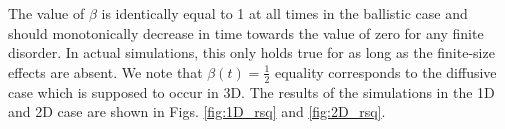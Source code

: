 \documentclass[10pt,a4paper]{article}
\begin{document}
\noindent 
The value of $\beta$ is identically equal to 1 at all times in the ballistic case and should monotonically decrease in time towards the value of zero for any finite disorder. In actual simulations, this only holds true for as long as the finite-size effects are absent. We note that $\beta(t)=\frac{1}{2}$ equality corresponds to the diffusive case which is supposed to occur in 3D. The results of the simulations in the 1D and 2D case are shown in Figs. \ref{fig:1D_rsq} and \ref{fig:2D_rsq}.\\\\
\end{document}
